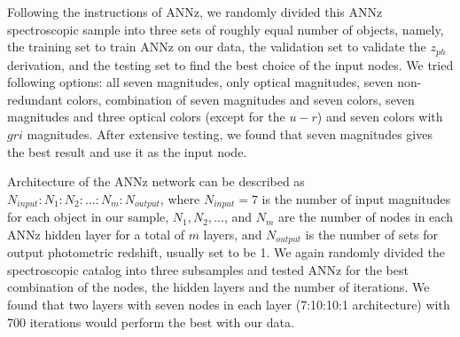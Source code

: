 \documentclass[apj,iop]{emulateapj}
\begin{document}
Following the instructions of ANNz, we randomly divided this ANNz spectroscopic sample into three sets of roughly equal number of objects, namely, the training set to train ANNz on our data, the validation set to validate the $z_{ph}$ derivation, and the testing set to find the best choice of the input nodes. We tried following options: all seven magnitudes, only optical magnitudes, seven non-redundant colors, combination of seven magnitudes and seven colors, seven magnitudes and three optical colors (except for the $u-r$) and seven colors with $gri$ magnitudes. After extensive testing, we found that seven magnitudes gives the best result and use it as the input node.

Architecture of the ANNz network can be described as $N_{input} : N_{1} : N_{2} : . . . : N_{m} : N_{output}$, where $N_{input}=7$ is the number of input magnitudes for each object in our sample, $N_{1}, N_{2},. . .$, and $N_{m}$ are the number of nodes in each ANNz hidden layer for a total of $m$ layers, and $N_{output}$ is the number of sets for output photometric redshift, usually set to be 1. We again randomly divided the spectroscopic catalog into three subsamples and tested ANNz for the best combination of the nodes, the hidden layers and the number of iterations. We found that two layers with seven nodes in each layer (7:10:10:1 architecture) with 700 iterations would perform the best with our data.
\end{document}
